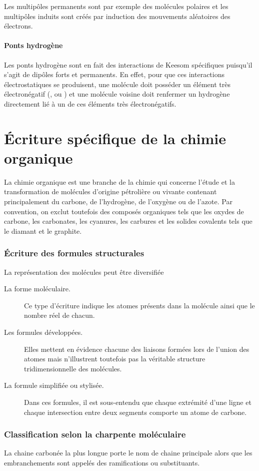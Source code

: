 Les multip\^oles permanents sont par exemple des molécules polaires 
et les multip\^oles induits sont créés par induction 
des mouvements aléatoires des électrons.

\subsection{Ponts hydrogène}
Les ponts hydrogène sont en fait des interactions de Keesom spécifiques puisqu'il s'agit de dipôles forts et permanents.
En effet, pour que ces interactions électrostatiques se produisent, une molécule doit posséder un élément très électronégatif (,  ou ) et une molécule voisine doit renfermer un hydrogène directement lié à un de ces éléments très électronégatifs.

\part{\'Ecriture spécifique de la chimie organique}
La chimie organique est une branche de la chimie qui concerne
l'étude et la transformation de molécules d'origine pétrolière 
ou vivante contenant principalement du carbone, de l'hydrogène, 
de l'oxygène ou de l'azote.
Par convention, on exclut toutefois des composés organiques tels que 
les oxydes de carbone, les carbonates, les cyanures, 
les carbures et les solides covalents tels que le diamant et le graphite.

\section{\'Ecriture des formules structurales}
La représentation des molécules peut être diversifiée
\begin{description}
  \item[La forme moléculaire.] Ce type d'écriture indique les atomes présents dans la molécule ainsi que le nombre réel de chacun.
  \item[Les formules développées.] Elles mettent en évidence chacune des liaisons formées lors de l'union des atomes
  mais n'illustrent toutefois pas la véritable structure tridimensionnelle des molécules.
  \item[La formule simplifiée ou stylisée.] Dans ces formules, il est sous-entendu que chaque extrémité d'une ligne et chaque intersection entre deux segments comporte un atome de carbone.
\end{description}

\section{Classification selon la charpente moléculaire}
La chaine carbonée la plus longue porte le nom de chaine principale alors que les embranchements sont appelés des ramifications ou substituants.
